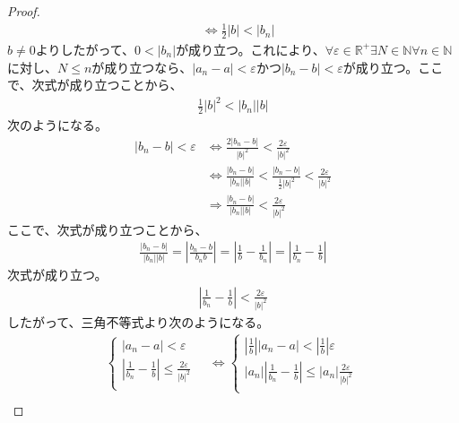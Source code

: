 \documentclass[dvipdfmx]{jsarticle}
\begin{document}
\begin{proof}
\begin{align*}
&\Leftrightarrow \frac{1}{2}|b| < \left| b_{n} \right|
\end{align*}
$b \neq 0$よりしたがって、$0 < \left| b_{n} \right|$が成り立つ。これにより、$\forall\varepsilon \in \mathbb{R}^{+}\exists N \in \mathbb{N}\forall n \in \mathbb{N}$に対し、$N \leq n$が成り立つなら、$\left| a_{n} - a \right| < \varepsilon$かつ$\left| b_{n} - b \right| < \varepsilon$が成り立つ。ここで、次式が成り立つことから、
\begin{align*}
\frac{1}{2}|b|^{2} < \left| b_{n} \right||b|
\end{align*}
次のようになる。
\begin{align*}
\left| b_{n} - b \right| < \varepsilon &\Leftrightarrow \frac{2\left| b_{n} - b \right|}{|b|^{2}} < \frac{2\varepsilon}{|b|^{2}}\\
&\Leftrightarrow \frac{\left| b_{n} - b \right|}{\left| b_{n} \right||b|} < \frac{\left| b_{n} - b \right|}{\frac{1}{2}|b|^{2}} < \frac{2\varepsilon}{|b|^{2}}\\
&\Rightarrow \frac{\left| b_{n} - b \right|}{\left| b_{n} \right||b|} < \frac{2\varepsilon}{|b|^{2}}
\end{align*}
ここで、次式が成り立つことから、
\begin{align*}
\frac{\left| b_{n} - b \right|}{\left| b_{n} \right||b|} = \left| \frac{b_{n} - b}{b_{n}b} \right| = \left| \frac{1}{b} - \frac{1}{b_{n}} \right| = \left| \frac{1}{b_{n}} - \frac{1}{b} \right|
\end{align*}
次式が成り立つ。
\begin{align*}
\left| \frac{1}{b_{n}} - \frac{1}{b} \right| < \frac{2\varepsilon}{|b|^{2}}
\end{align*}
したがって、三角不等式より次のようになる。
\begin{align*}
\left\{ \begin{matrix}
\left| a_{n} - a \right| < \varepsilon \\
\left| \frac{1}{b_{n}} - \frac{1}{b} \right| \leq \frac{2\varepsilon}{|b|^{2}} \\
\end{matrix} \right.\  &\Leftrightarrow \left\{ \begin{matrix}
\left| \frac{1}{b} \right|\left| a_{n} - a \right| < \left| \frac{1}{b} \right|\varepsilon \\
\left| a_{n} \right|\left| \frac{1}{b_{n}} - \frac{1}{b} \right| \leq \left| a_{n} \right|\frac{2\varepsilon}{|b|^{2}} \\
\end{matrix} \right.\ \\

\end{align*}
\end{proof}
\end{document}
